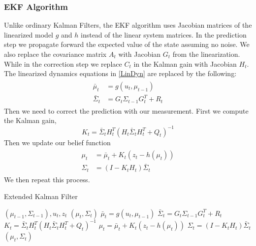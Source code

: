 \documentclass[twoside]{article}
\begin{document}
\subsubsection{EKF Algorithm}
Unlike ordinary Kalman Filters, the EKF algorithm uses Jacobian matrices of the linearized model $g$ and $h$ instead of the linear system matrices.
In the prediction step we propagate forward the expected value of the state assuming no noise. We also replace the covariance matrix $A_t$ with Jacobian $G_t$ from the linearization. While in the correction step we replace $C_t$ in the Kalman gain with Jacobian $H_t$. The linearized dynamics equations in \eqref{LinDyn} are replaced by the following:
\begin{align}
\begin{split}
\bar{\mu}_t &= g(u_t,\mu_{t-1})
\\\bar{\Sigma}_t &= G_t\Sigma_{t-1} G_t^{T} + R_t
\end{split}
\end{align}
Then we need to correct the prediction with our measurement. First we compute the Kalman gain,
\begin{equation}
K_t = \bar{\Sigma}_{t}H_t^{T}(H_t\bar{\Sigma}_{t}H_t^{T}+Q_t)^{-1}
\end{equation}
Then we update our belief function
\begin{align}
\begin{split}
\mu_t &= \bar{\mu}_t+K_t(z_t-h(\mu_{t})) \\
\Sigma_t &= (I-K_t H_t)\bar{\Sigma}_t
\end{split}
\end{align}
We then repeat this process.

\begin{algorithm}[H]
\caption{Extended Kalman Filter}
\begin{algorithmic}[1]
    $(\mu_{t-1}, \Sigma_{t-1}), u_t, z_t$
	$\left(\mu_t, \Sigma_t\right)$
	\State $	\bar{\mu}_t = g(u_t,\mu_{t-1})$\;
	\State $	\bar{\Sigma}_t = G_t\Sigma_{t-1} G_t^{T} + R_t$\;
	\State $ 	K_t = \bar{\Sigma}_{t}H_t^{T}(H_t\bar{\Sigma}_{t}H_t^{T}+Q_t)^{-1}$\;
	\State $    \mu_t = \bar{\mu}_t+K_t(z_t-h(\mu_{t}))$\;
	\State $   \Sigma_t = (I-K_t H_t)\bar{\Sigma}_t$\;
	$(\mu_t, \Sigma_t)$
\end{algorithmic}
\end{algorithm}
\end{document}

